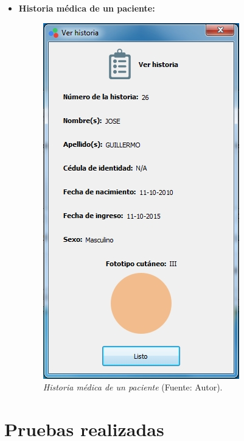 \begin{itemize}
		 	\item \textbf{Historia m\'{e}dica de un paciente:}
 	
 		\begin{figure}[H]
		\centering
		\includegraphics[scale=0.6]{img/vista-historia.jpg}
			\caption[Historia m\'{e}dica de un paciente]{\textit{Historia m\'{e}dica de un paciente} (Fuente: Autor).}
	\end{figure}

\end{itemize}

\newpage

\section{Pruebas realizadas}
